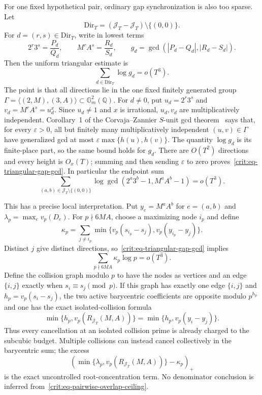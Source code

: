 \documentclass[11pt,oneside]{article}
\theoremstyle{definition}
\theoremstyle{remark}
\newcommand{\Q}{\mathbb Q}
\begin{document}
For one fixed hypothetical pair, ordinary gap synchronization is also too sparse.  Let
\[
 \mathrm{Dir}_T=(\mathcal J_T-\mathcal J_T)\setminus\{(0,0)\}.
\]
For $d=(r,s)\in\mathrm{Dir}_T$, write in lowest terms
\[
 2^r3^s=\frac{P_d}{Q_d},\qquad
 M^rA^s=\frac{R_d}{S_d},\qquad
 g_d=\gcd(|P_d-Q_d|,|R_d-S_d|).
\]
Then the uniform triangular estimate is
\begin{equation}
 \boxed{\sum_{d\in\mathrm{Dir}_T}\log g_d=o(T^3).}
 \label{crit:eq-triangular-gap-gcd}
\end{equation}
The point is that all directions lie in the one fixed finitely generated group
$\Gamma=\langle(2,M),(3,A)\rangle\subset\mathbb G_m^2(\Q)$.  For $d\ne0$, put
$u_d=2^r3^s$ and $v_d=M^rA^s=u_d^x$.  Since $u_d\ne1$ and $x$ is irrational, $u_d,v_d$
are multiplicatively independent.  Corollary~1 of the Corvaja--Zannier $S$-unit gcd
theorem~\cite{CorvajaZannier2005} says that, for every $\varepsilon>0$, all but finitely
many multiplicatively independent $(u,v)\in\Gamma$ have generalized gcd at most
$\varepsilon\max\{h(u),h(v)\}$.  The quantity $\log g_d$ is its finite-place part, so the
same bound holds for $g_d$.  There are $O(T^2)$ directions and every height is $O_x(T)$;
summing and then sending $\varepsilon$ to zero proves~\eqref{crit:eq-triangular-gap-gcd}.
In particular the endpoint sum
\[
 \sum_{(a,b)\in\mathcal J_T\setminus\{(0,0)\}}
 \log\gcd(2^a3^b-1,M^aA^b-1)=o(T^3).
\]

This has a precise local interpretation.  Put $y_e=M^aA^b$ for $e=(a,b)$ and
$\lambda_p=\max_e v_p(D_e)$.  For $p\nmid6MA$, choose a maximizing node $i_p$ and define
\begin{equation}
 \kappa_p=\sum_{j\ne i_p}
 \min\{v_p(s_{i_p}-s_j),v_p(y_{i_p}-y_j)\}.
 \label{crit:eq-pairwise-overlap-budget}
\end{equation}
Distinct $j$ give distinct directions, so~\eqref{crit:eq-triangular-gap-gcd} implies
\begin{equation}
 \sum_{p\nmid6MA}\kappa_p\log p=o(T^3).
 \label{crit:eq-pairwise-overlap-ceiling}
\end{equation}
Define the collision graph modulo $p$ to have the nodes as vertices and an edge $\{i,j\}$
exactly when $s_i\equiv s_j\pmod p$.  If this graph has exactly one edge $\{i,j\}$ and
$h_p=v_p(s_i-s_j)$, the two active barycentric coefficients are opposite modulo $p^{h_p}$ and
one has the exact isolated-collision formula
\begin{equation}
 \min\{h_p,v_p(R_{\mathcal J_T}(M,A))\}
 =\min\{h_p,v_p(y_i-y_j)\}.
 \label{crit:eq-isolated-collision-cancellation}
\end{equation}
Thus every cancellation at an isolated collision prime is already charged to the
subcubic budget.  Multiple collisions can instead cancel collectively in the barycentric
sum; the excess
\[
 \left(\min\{\lambda_p,v_p(R_{\mathcal J_T}(M,A))\}-\kappa_p\right)_+
\]
is the exact uncontrolled root-concentration term.  No denominator conclusion is inferred
from~\eqref{crit:eq-pairwise-overlap-ceiling}.
\end{document}
